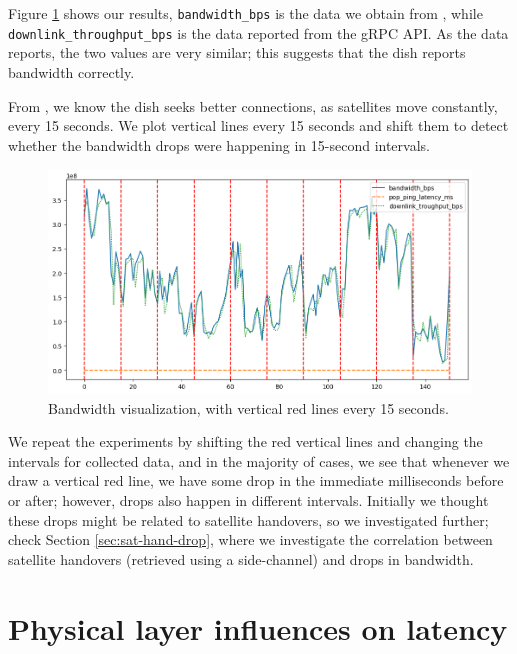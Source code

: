 \documentclass[IN,11pt,twoside,openright,idp,english]{tumthesis}
\begin{document}
Figure \ref{fig:vis-bw-15sec} shows our results, \texttt{bandwidth\_bps} is the data we obtain from
, while \texttt{downlink\_throughput\_bps} is the data reported
from the gRPC API. As the data reports, the two values are very similar; this suggests that the dish reports bandwidth
correctly.

From \cite{llc-application}, we know the dish seeks better connections, as satellites move constantly, every 15 seconds.
We plot vertical lines every 15 seconds and shift them to detect whether the bandwidth drops were happening in 15-second
intervals.

\begin{figure}
    \centering
    \includegraphics[width=1.0\columnwidth]{img/bw-15seconds.png}
    \caption{Bandwidth visualization, with vertical red lines every 15 seconds.}
    \label{fig:vis-bw-15sec}
\end{figure}

We repeat the experiments by shifting the red vertical lines and changing the intervals for collected data, and in the
majority of cases, we see that whenever we draw a vertical red line, we have some drop in the immediate milliseconds
before or after; however, drops also happen in different intervals. Initially we thought these drops might be related to
satellite handovers, so we investigated further; check Section \ref{sec:sat-hand-drop}, where we investigate the
correlation between satellite handovers (retrieved using a side-channel) and drops in bandwidth. 

\section{Physical layer influences on latency}
\end{document}
